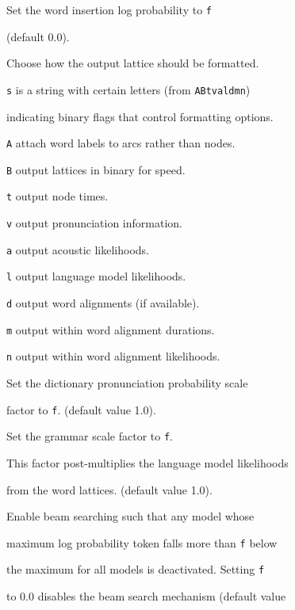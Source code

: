 \begin{optlist}
    Set the word insertion log probability to \texttt{f} 


        (default 0.0).





   Choose how the output lattice should be formatted.


         \texttt{s} is a string with certain letters (from \texttt{ABtvaldmn})


         indicating binary flags that control formatting options.


         \texttt{A} attach word labels to arcs rather than nodes.


         \texttt{B} output lattices in binary for speed.


         \texttt{t} output node times.


         \texttt{v} output pronunciation information.


         \texttt{a} output acoustic likelihoods.


         \texttt{l} output language model likelihoods.


         \texttt{d} output word alignments (if available).


         \texttt{m} output within word alignment durations.


         \texttt{n} output within word alignment likelihoods.





   Set the dictionary pronunciation probability scale 


        factor to \texttt{f}. (default value 1.0).





   Set the grammar scale factor to \texttt{f}.


        This factor post-multiplies the language model likelihoods


        from the word lattices.  (default value 1.0).


   


   Enable beam searching such that any model whose 


        maximum log probability token falls more than \texttt{f} below


        the maximum for all models is deactivated.  Setting \texttt{f}


        to 0.0 disables the beam search mechanism (default value



\end{optlist}
